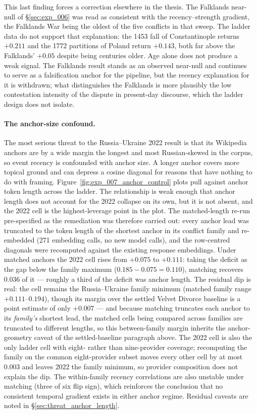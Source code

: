 This last finding forces a correction elsewhere in the thesis. The
Falklands near-null of \S\ref{sec:exp_006} was read as consistent
with the recency--strength gradient, the Falklands War being the
oldest of the five conflicts in that sweep. The ladder data do not
support that explanation: the 1453 fall of Constantinople returns
$+0.211$ and the 1772 partitions of Poland return $+0.143$, both far
above the Falklands' $+0.05$ despite being centuries older. Age
alone does not produce a weak signal. The Falklands result stands as
an observed near-null and continues to serve as a falsification
anchor for the pipeline, but the recency explanation for it is
withdrawn; what distinguishes the Falklands is more plausibly the
low contestation intensity of the dispute in present-day discourse,
which the ladder design does not isolate.

\paragraph{The anchor-size confound.} The most serious threat to the
Russia--Ukraine 2022 result is that its Wikipedia anchors are by a
wide margin the longest and most Russian-skewed in the corpus, so
event recency is confounded with anchor size. A longer anchor covers
more topical ground and can depress a cosine diagonal for reasons
that have nothing to do with framing.
Figure~\ref{fig:exp_007_anchor_control} plots pull against anchor
token length across the ladder. The relationship is weak enough that
anchor length does not account for the 2022 collapse on its own, but
it is not absent, and the 2022 cell is the highest-leverage point in
the plot. The matched-length re-run pre-specified as the remediation
was therefore carried out: every anchor lead was truncated to the
token length of the shortest anchor in its conflict family and
re-embedded (271 embedding calls, no new model calls), and the
row-centred diagonals were recomputed against the existing response
embeddings. Under matched anchors the 2022 cell rises from $+0.075$
to $+0.111$: taking the deficit as the gap below the family maximum
($0.185 - 0.075 = 0.110$), matching recovers $0.036$ of it ---
roughly a third of the deficit was anchor length. The
residual dip is real: the cell remains the Russia--Ukraine family
minimum (matched family range $+0.111$--$0.194$), though its margin
over the settled Velvet Divorce baseline is a point estimate of
only $+0.007$ --- and because matching truncates each anchor to its
\emph{family's} shortest lead, the matched cells being compared
across families are truncated to different lengths, so this
between-family margin inherits the anchor-geometry caveat of the
settled-baseline paragraph above. The 2022 cell is also the only ladder cell with
eight- rather than nine-provider coverage; recomputing the family
on the common eight-provider subset moves every other cell by at
most $0.003$ and leaves 2022 the family minimum, so provider
composition does not explain the dip. The
within-family recency correlations are also unstable under matching
(three of six flip sign), which reinforces the conclusion that no
consistent temporal gradient exists in either anchor regime.
Residual caveats are noted in \S\ref{sec:threat_anchor_length}.

